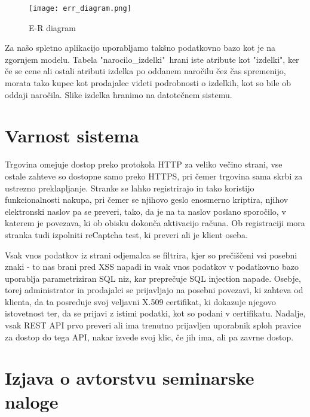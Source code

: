 \documentclass[a4paper,12pt]{report}
\begin{document}
\begin{figure}[htbp]
\begin{center}
\texttt{[image: err\_diagram.png]}
\caption{E-R diagram}
\label{Tekstovni dendrogram}
\end{center}
\end{figure}

Za našo spletno aplikacijo uporabljamo takšno podatkovno bazo kot je na zgornjem modelu. Tabela "narocilo\_izdelki"\ hrani iste atribute kot "izdelki", ker če se cene ali ostali atributi izdelka po oddanem naročilu čez čas spremenijo, morata tako kupec kot prodajalec videti podrobnosti o izdelkih, kot so bile ob oddaji naročila. Slike izdelka hranimo na datotečnem sistemu.

\chapter{Varnost sistema}

Trgovina omejuje dostop preko protokola HTTP za veliko večino strani, vse ostale zahteve so dostopne samo preko HTTPS, pri čemer trgovina sama skrbi za ustrezno preklapljanje. Stranke se lahko registrirajo in tako koristijo funkcionalnosti nakupa, pri čemer se njihovo geslo enosmerno kriptira, njihov elektronski naslov pa se preveri, tako, da je na ta naslov poslano sporočilo, v katerem je povezava, ki ob obisku dokonča aktivacijo računa. Ob registraciji mora stranka tudi izpolniti reCaptcha test, ki preveri ali je klient oseba.

Vsak vnos podatkov iz strani odjemalca se filtrira, kjer so prečiščeni vsi posebni znaki - to nas brani pred XSS napadi in vsak vnos podatkov v podatkovno bazo uporablja parametriziran SQL niz, kar preprečuje SQL injection napade. Osebje, torej administrator in prodajalci se prijavljajo na posebni povezavi, ki zahteva od klienta, da ta posreduje svoj veljavni X.509 certifikat, ki dokazuje njegovo istovetnost ter, da se prijavi z istimi podatki, kot so podani v certifikatu. Nadalje, vsak REST API prvo preveri ali ima trenutno prijavljen uporabnik sploh pravice za dostop do tega API, nakar izvede svoj klic, če jih ima, ali pa zavrne dostop.

\chapter{Izjava o avtorstvu seminarske naloge}
\end{document}
